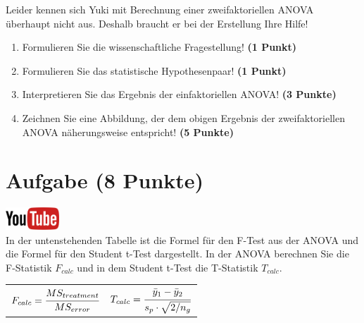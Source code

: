 \documentclass[a4paper, 9pt]{scrartcl}\usepackage[]{graphicx}\usepackage[]{xcolor}
\begin{document}
\vspace{1ex}

Leider kennen sich Yuki mit Berechnung einer zweifaktoriellen ANOVA überhaupt nicht aus. Deshalb braucht er bei der Erstellung Ihre Hilfe! 

\begin{enumerate}
  \item Formulieren Sie die wissenschaftliche Fragestellung! \textbf{(1 Punkt)}
  \item Formulieren Sie das statistische Hypothesenpaar! \textbf{(1 Punkt)}
\item Interpretieren Sie das Ergebnis der einfaktoriellen ANOVA! \textbf{(3 Punkte)} 
\item Zeichnen Sie eine Abbildung, der dem obigen Ergebnis der
  zweifaktoriellen ANOVA näherungsweise entspricht! \textbf{(5 Punkte)}
\end{enumerate}
 
\clearpage

\section{Aufgabe \hfill (8 Punkte)}


\hfill\href{https://youtu.be/FjjJXkFJfIY}{\includegraphics[width =
  2cm]{img/youtube}}\\[1Ex]


In der untenstehenden Tabelle ist die Formel f{\"u}r den F-Test aus der ANOVA
und die Formel f{\"u}r den Student t-Test dargestellt. In der ANOVA berechnen
Sie die F-Statistik $F_{calc}$ und in dem Student t-Test die T-Statistik
$T_{calc}$.

\begin{center}
  \begin{tabular}{cc}
    $F_{calc} = \cfrac{MS_{treatment}}{MS_{error}}$ & $T_{calc} = \cfrac{\bar{y}_1 - \bar{y}_2}{s_p \cdot \sqrt{2/n_g}}$\\
  \end{tabular}
\end{center}
\end{document}
